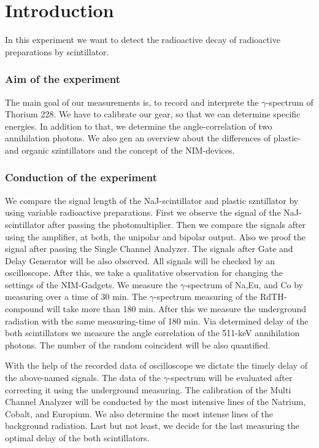 \documentclass[11pt,a4paper]{article}
\begin{document}
\part{Introduction}
In this experiment we want to detect the radioactive decay of radioactive preparations by scintillator.
\section*{Aim of the experiment}
The main goal of our measurements is, to record and interprete the $\gamma$-spectrum of Thorium 228. We have to calibrate our gear, so that we can determine specific energies. In addition to that, we determine the angle-correlation of two annihilation photons. We also gen an overview about the differences of plastic- and organic szintillators and the concept of the NIM-devices.
\section{Conduction of the experiment}
We compare the signal length of the NaJ-scintillator and plastic szntillator by using variable radioactive preparations. First we observe the signal of the NaJ-scintillator after passing the photomultiplier. Then we compare the signals after using the amplifier, at both, the unipolar and bipolar output. Also we proof the signal after passing the Single Channel Analyzer. The signals after Gate and Delay Generator will be also observed. All signals will be checked by an oscilloscope. After this, we take a qualitative observation for changing the settings of the NIM-Gadgets.
We measure the $\gamma$-spectrum of Na,Eu, and Co by measuring over a time of 30 min. The $\gamma$-spectrum measuring of the RdTH-compound will take more than 180 min. After this we measure the underground radiation with the same measuring-time of 180 min.
Via determined delay of the both scintillators we measure the angle correlation of the 511-keV annihilation photons. The number of the random coincident will be also quantified.

With the help of the recorded data of oscilloscope we dictate the timely delay of the above-named signals. The data of the $\gamma$-spectrum will be evaluated after correcting it using the underground measuring.
The calibration of the Multi Channel Analyzer will be conducted by the most intensive lines of the Natrium, Cobalt, and Europium. We also determine the most intense lines of the background radiation. Last but not least, we decide for the last measuring the optimal delay of the both scintillators.
\end{document}

